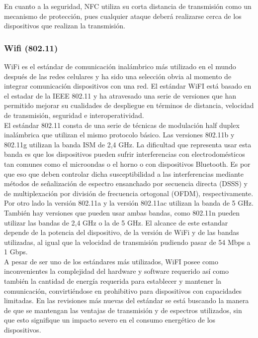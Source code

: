 En cuanto a la seguridad, NFC utiliza su corta distancia de transmisión como un mecanismo de protección, pues cualquier ataque deberá realizarse cerca de los dispositivos que realizan la transmisión. 

\subsubsection{Wifi (802.11)} 
WiFi es el estándar de comunicación inalámbrico más utilizado en el mundo después de las redes celulares y ha sido una selección obvia al momento de integrar comunicación dispositivos con una red. El estándar WiFI está basado en el estadar de la IEEE 802.11\cite{ieee80211} y ha atravesado una serie de versiones que han permitido mejorar su cualidades de despliegue en términos de distancia, velocidad de transmisión, seguridad e interoperatividad.\\  

El estándar 802.11 consta de una serie de técnicas de modulación half duplex inalámbrica que utilizan el mismo protocolo básico. Las versiones 802.11b y 802.11g utilizan la banda ISM de 2,4 GHz. La dificultad que representa usar esta banda es que los dispositivos pueden sufrir interferencias con electrodomésticos tan comunes como el microondas o el horno o con dispositivos Bluetooth. Es por que eso que deben controlar dicha susceptibilidad a las interferencias mediante métodos de señalización de espectro ensanchado por secuencia directa (DSSS) y de multiplexación por división de frecuencia ortogonal (OFDM), respectivamente.\\

Por otro lado la versión 802.11a y la versión 802.11ac utilizan la banda de 5 GHz. También hay versiones que pueden usar ambas bandas, como 802.11n pueden utilizar las bandas de 2,4 GHz o la de 5 GHz. El alcance de este estandar depende de la potencia del dispositivo, de la versión de WiFi y de las bandas utilizadas, al igual que la velocidad de transmisión pudiendo pasar de 54 Mbps a 1 Gbps. \\

A pesar de ser uno de los estándares más utilizados, WiFI posee como inconvenientes la complejidad del hardware y software requerido así como también la cantidad de energía requerida para establecer y mantener la comunicación, convirtiéndose en prohibitivo para dispositivos con capacidades limitadas. En las revisiones más nuevas del estándar se está buscando la manera de que se mantengan las ventajas de transmisión y de espectros utilizados, sin que esto signifique un impacto severo en el consumo energético de los dispositivos. 

